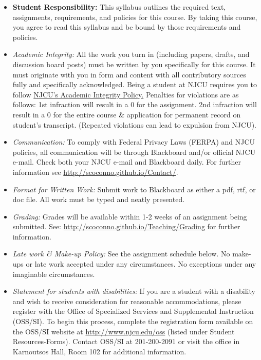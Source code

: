 \documentclass[article,oneside]{memoir}
\begin{document}
\begin{itemize}

\item \textbf{Student Responsibility:} This syllabus outlines the required text, assignments, requirements, and policies for this course. By taking this course, you agree to read this syllabus and be bound by those requirements and policies. 

 \item \textit{Academic Integrity:} All the work you turn in (including papers, drafts, and discussion board posts) must be written by you specifically for this course. It must originate with you in form and content with all contributory sources fully and specifically acknowledged. Being a student at NJCU requires you to follow \href{http://scoconno.github.io/Teaching/Plagiarism.pdf}{NJCU's Academic Integrity Policy.} Penalties for violations are as follows: 1st infraction will result in a 0 for the assignment.  2nd infraction will result in a 0 for the entire course \& application for permanent record on student's transcript. (Repeated violations can lead to expulsion from NJCU). 


\item \textit{Communication:} To comply with Federal Privacy Laws (FERPA) and NJCU policies, all communication will be through Blackboard and/or official NJCU e-mail. Check both your NJCU e-mail and Blackboard daily. For further information see \href{http://scoconno.github.io/Contact/}{http://scoconno.github.io/Contact/}.



\item \textit{Format for Written Work:} Submit work to Blackboard as either a pdf, rtf, or doc file. All work must be typed and neatly presented. 



\item \textit{Grading:} Grades will be available within 1-2 weeks of an assignment being submitted. See: \href{http://scoconno.github.io/Teaching/Grading}{http://scoconno.github.io/Teaching/Grading} for further information.


\item \textit{Late work \& Make-up Policy:} See the assignment schedule below. No make-ups or late work accepted under any circumstances. No exceptions under any imaginable circumstances. 


\item \textit{Statement for students with disabilities:} If you are a student
with a disability and wish to receive consideration for reasonable
accommodations, please register with the Office of Specialized Services
and Supplemental Instruction (OSS/SI). To begin this process, complete
the registration form available on the OSS/SI website at
\href{http://www.njcu.edu/oss}{http://www.njcu.edu/oss}
(listed under Student Resources-Forms). Contact OSS/SI at 201-200-2091
or visit the office in Karnoutsos Hall, Room 102 for additional
information.


\end{itemize}
\end{document}
